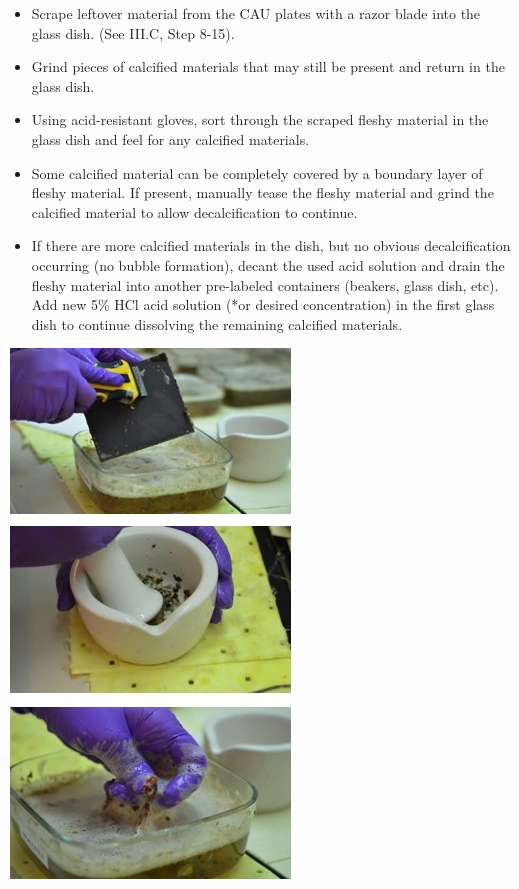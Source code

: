 \documentclass[]{book}
\begin{document}
\begin{itemize}
\item
  Scrape leftover material from the CAU plates with a razor blade into the glass dish. (See III.C, Step 8-15).
\item
  Grind pieces of calcified materials that may still be present and return in the glass dish.
\item
  Using acid-resistant gloves, sort through the scraped fleshy material in the glass dish and feel for any calcified materials.
\item
  Some calcified material can be completely covered by a boundary layer of fleshy material. If present, manually tease the fleshy material and grind the calcified material to allow decalcification to continue.
\item
  If there are more calcified materials in the dish, but no obvious decalcification occurring (no bubble formation), decant the used acid solution and drain the fleshy material into another pre-labeled containers (beakers, glass dish, etc). Add new 5\% HCl acid solution (*or desired concentration) in the first glass dish to continue dissolving the remaining calcified materials.
\end{itemize}

\includegraphics{images/CAU_dissolve.jpg}
\end{document}
